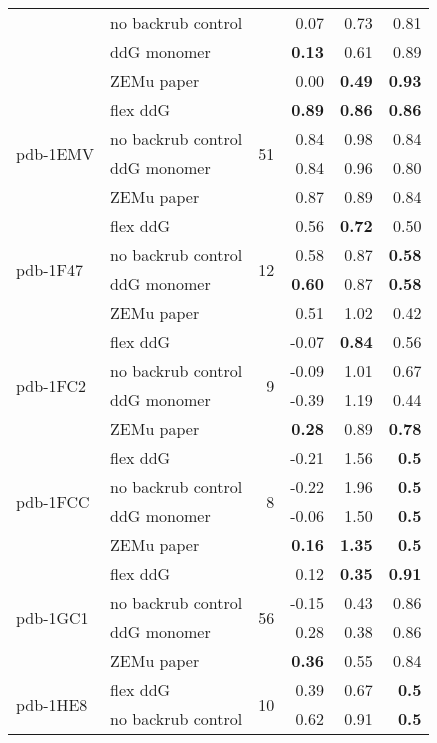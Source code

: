 {\begin{longtable}{llrrrr}
 & no backrub control & & 0.07 & 0.73 & 0.81  \\
 & ddG monomer & & \textbf{0.13} & 0.61 & 0.89  \\
 & ZEMu paper & & 0.00 & \textbf{0.49} & \textbf{0.93}  \\
\hline
 \multirow{ 4}{*}{pdb-1EMV} & flex ddG & \multirow{ 4}{*}{51} & \textbf{0.89} & \textbf{0.86} & \textbf{0.86}  \\
 & no backrub control & & 0.84 & 0.98 & 0.84  \\
 & ddG monomer & & 0.84 & 0.96 & 0.80  \\
 & ZEMu paper & & 0.87 & 0.89 & 0.84  \\
\hline
 \multirow{ 4}{*}{pdb-1F47} & flex ddG & \multirow{ 4}{*}{12} & 0.56 & \textbf{0.72} & 0.50  \\
 & no backrub control & & 0.58 & 0.87 & \textbf{0.58}  \\
 & ddG monomer & & \textbf{0.60} & 0.87 & \textbf{0.58}  \\
 & ZEMu paper & & 0.51 & 1.02 & 0.42  \\
\hline
 \multirow{ 4}{*}{pdb-1FC2} & flex ddG & \multirow{ 4}{*}{9} & -0.07 & \textbf{0.84} & 0.56  \\
 & no backrub control & & -0.09 & 1.01 & 0.67  \\
 & ddG monomer & & -0.39 & 1.19 & 0.44  \\
 & ZEMu paper & & \textbf{0.28} & 0.89 & \textbf{0.78}  \\
\hline
 \multirow{ 4}{*}{pdb-1FCC} & flex ddG & \multirow{ 4}{*}{8} & -0.21 & 1.56 & \textbf{0.5}  \\
 & no backrub control & & -0.22 & 1.96 & \textbf{0.5}  \\
 & ddG monomer & & -0.06 & 1.50 & \textbf{0.5}  \\
 & ZEMu paper & & \textbf{0.16} & \textbf{1.35} & \textbf{0.5}  \\
\hline
 \multirow{ 4}{*}{pdb-1GC1} & flex ddG & \multirow{ 4}{*}{56} & 0.12 & \textbf{0.35} & \textbf{0.91}  \\
 & no backrub control & & -0.15 & 0.43 & 0.86  \\
 & ddG monomer & & 0.28 & 0.38 & 0.86  \\
 & ZEMu paper & & \textbf{0.36} & 0.55 & 0.84  \\
\hline
 \multirow{ 4}{*}{pdb-1HE8} & flex ddG & \multirow{ 4}{*}{10} & 0.39 & 0.67 & \textbf{0.5}  \\
 & no backrub control & & 0.62 & 0.91 & \textbf{0.5}  \\

\end{longtable}}

